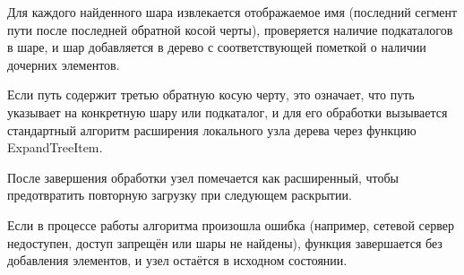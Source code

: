 Для каждого найденного шара извлекается отображаемое имя (последний сегмент пути после последней обратной косой черты), проверяется наличие подкаталогов в шаре, и шар добавляется в дерево с соответствующей пометкой о наличии дочерних элементов.

Если путь содержит третью обратную косую черту, это означает, что путь указывает на конкретную шару или подкаталог, и для его обработки вызывается стандартный алгоритм расширения локального узла дерева через функцию ExpandTreeItem.

После завершения обработки узел помечается как расширенный, чтобы предотвратить повторную загрузку при следующем раскрытии.

Если в процессе работы алгоритма произошла ошибка (например, сетевой сервер недоступен, доступ запрещён или шары не найдены), функция завершается без добавления элементов, и узел остаётся в исходном состоянии.